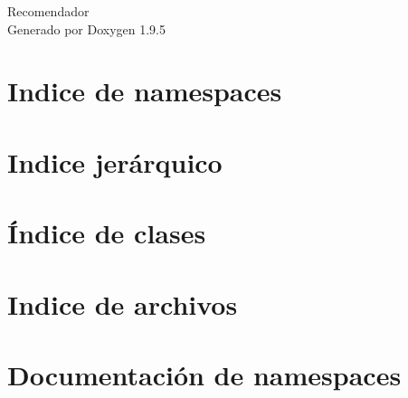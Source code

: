 \documentclass[twoside]{book}
\newcommand{\+}{\discretionary{\mbox{\scriptsize$\hookleftarrow$}}{}{}}
\newcommand{\clearemptydoublepage}{%
    \newpage{\pagestyle{empty}\cleardoublepage}%
  }
\begin{document}
  \raggedbottom
    \hypersetup{pageanchor=false,
                bookmarksnumbered=true,
                pdfencoding=unicode
               }
  \begin{titlepage}
  \vspace*{7cm}
  \begin{center}%
  {\Large Recomendador}\\
  \vspace*{1cm}
  {\large Generado por Doxygen 1.9.5}\\
  \end{center}
  \end{titlepage}
  \clearemptydoublepage
  \tableofcontents
  \clearemptydoublepage
  \hypersetup{pageanchor=true}
\chapter{Indice de namespaces}

\chapter{Indice jerárquico}

\chapter{Índice de clases}

\chapter{Indice de archivos}

\chapter{Documentación de namespaces}


\end{document}
